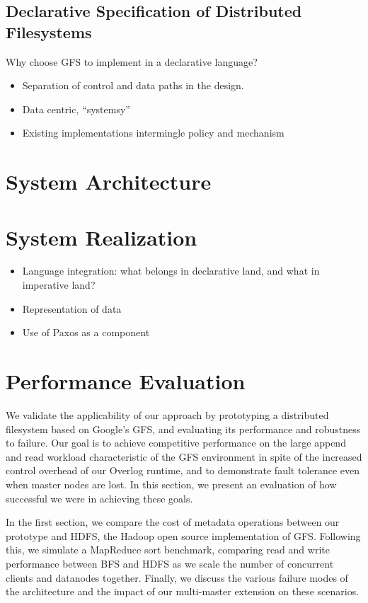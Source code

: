 \documentclass{article}
\begin{document}
\subsection{Declarative Specification of Distributed Filesystems}
Why choose GFS to implement in a declarative language?
\begin{itemize}
\item
  Separation of control and data paths in the design.

\item
  Data centric, ``systemsy''

\item
  Existing implementations intermingle policy and mechanism
\end{itemize}

\section{System Architecture}

\section{System Realization}
\begin{itemize}
\item
  Language integration: what belongs in declarative land, and what in
  imperative land?

\item
  Representation of data

\item
  Use of Paxos as a component
\end{itemize}

\section{Performance Evaluation}
We  validate the applicability of our approach by prototyping a distributed filesystem based on Google's GFS, and evaluating its performance and robustness to failure.  Our goal is to achieve competitive performance on the large append and read workload characteristic of the GFS environment in spite of the increased control overhead of our Overlog runtime, and to demonstrate fault tolerance even when master nodes are lost.  In this section, we present an evaluation of how successful we were in achieving these goals.

In the first section, we compare the cost of metadata operations between our prototype and HDFS, the Hadoop open source implementation of GFS.  Following this, we simulate a MapReduce sort benchmark, comparing read and write performance between BFS and HDFS as we 
scale the number of concurrent clients and datanodes together.  Finally, we discuss the various failure modes of the architecture and the impact of our multi-master extension on these scenarios.
\end{document}
